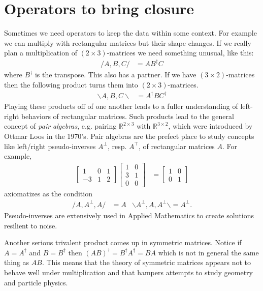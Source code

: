 \section{Operators to bring closure}
Sometimes we need operators to keep the data within some context.
For example we can multiply with rectangular matrices but their shape changes.
If we really plan a multiplication of $(2\times 3)$-matrices we need 
something unusual, like this:
\begin{align*}
    /A,B,C/ & = AB^{\dagger}C
\end{align*}
where $B^{\dagger}$ is the transpose.  This also has a partner.  If we have
$(3\times 2)$-matrices then the following product turns them into $(2\times 3)$-matrices.
\begin{align*}
    \backslash A,B,C\backslash & = A^{\dagger} B C^{\dagger}
\end{align*}
Playing these products off of one another leads to a fuller understanding of left-right 
behaviors of rectangular matrices.
Such products lead to the general 
concept of \emph{pair algebras}, e.g. pairing $\mathbb{R}^{2\times 3}$ 
with $\mathbb{R}^{3\times 2}$, which were introduced by Ottmar Loos in the 1970's.
Pair algebras are the prefect place to study concepts like left/right pseudo-inverses $A^{\bot}$, resp. $A^{\top}$, of rectangular matrices $A$.
For example,
\begin{align*}
    \begin{bmatrix}
         1& 0 & 1\\
         -3 & 1 & 2
    \end{bmatrix}
    \begin{bmatrix}
        1 & 0\\
        3 & 1\\
        0 & 0 
    \end{bmatrix}
    & = 
    \begin{bmatrix} 1 & 0 \\ 0 & 1 \end{bmatrix}
\end{align*}
axiomatizes as the condition 
\begin{align*}
    /A,A^{\bot},A/&=A & \backslash A^{\bot},A,A^{\bot}\backslash =A^{\bot}.
\end{align*}
Pseudo-inverses are extensively used in Applied Mathematics to create 
solutions resilient to noise.

Another serious trivalent product comes up 
in symmetric matrices.  Notice if $A=A^{\dagger}$ and $B=B^{\dagger}$
then $(AB)^{\dagger}=B^{\dagger}A^{\dagger}=BA$ which is not in general 
the same thing as $AB$.  This means that the theory of symmetric matrices 
appears not to behave well under multiplication and that hampers attempts 
to study geometry and particle physics.

